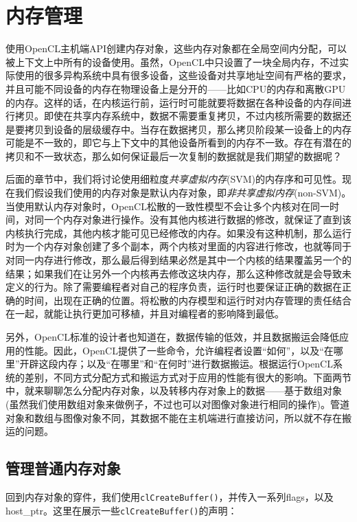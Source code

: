 \section{内存管理}

使用OpenCL主机端API创建内存对象，这些内存对象都在全局空间内分配，可以被上下文上中所有的设备使用。虽然，OpenCL中只设置了一块全局内存，不过实际使用的很多异构系统中具有很多设备，这些设备对共享地址空间有严格的要求，并且可能不同设备的内存在物理设备上是分开的——比如CPU的内存和离散GPU的内存。这样的话，在内核运行前，运行时可能就要将数据在各种设备的内存间进行拷贝。即使在共享内存系统中，数据不需要重复拷贝，不过内核所需要的数据还是要拷贝到设备的层级缓存中。当存在数据拷贝，那么拷贝阶段某一设备上的内存可能是不一致的，即它与上下文中的其他设备所看到的内存不一致。存在有潜在的拷贝和不一致状态，那么如何保证最后一次复制的数据就是我们期望的数据呢？

后面的章节中，我们将讨论使用细粒度\emph{共享虚拟内存}(SVM)的内存序和可见性。现在我们假设我们使用的内存对象是默认内存对象，即\emph{非共享虚拟内存}(non-SVM)。当使用默认内存对象时，OpenCL松散的一致性模型不会让多个内核对在同一时间，对同一个内存对象进行操作。没有其他内核进行数据的修改，就保证了直到该内核执行完成，其他内核才能可见已经修改的内存。如果没有这种机制，那么运行时为一个内存对象创建了多个副本，两个内核对里面的内容进行修改，也就等同于对同一内存进行修改，那么最后得到结果必然是其中一个内核的结果覆盖另一个的结果；如果我们在让另外一个内核再去修改这块内存，那么这种修改就是会导致未定义的行为。除了需要编程者对自己的程序负责，运行时也要保证正确的数据在正确的时间，出现在正确的位置。将松散的内存模型和运行时对内存管理的责任结合在一起，就能让执行更加可移植，并且对编程者的影响降到最低。

另外，OpenCL标准的设计者也知道在，数据传输的低效，并且数据搬运会降低应用的性能。因此，OpenCL提供了一些命令，允许编程者设置“如何”，以及“在哪里”开辟这段内存；以及“在哪里”和“在何时”进行数据搬运。根据运行OpenCL系统的差别，不同方式分配方式和搬运方式对于应用的性能有很大的影响。下面两节中，就来聊聊怎么分配内存对象，以及转移内存对象上的数据——基于数组对象(虽然我们使用数组对象来做例子，不过也可以对图像对象进行相同的操作)。管道对象和数组与图像对象不同，其数据不能在主机端进行直接访问，所以就不存在搬运的问题。

\subsection{管理普通内存对象}

回到内存对象的穿件，我们使用\texttt{clCreateBuffer()}，并传入一系列flags，以及host\_\allowbreak{}ptr。这里在展示一些\texttt{clCreateBuffer()}的声明：

